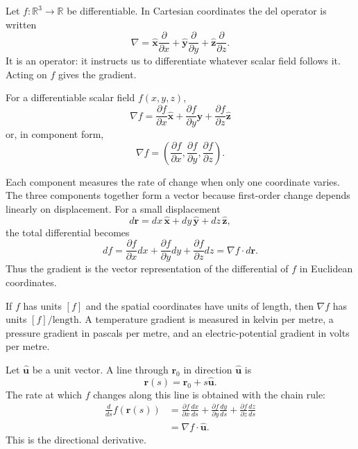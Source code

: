 
Let $f:\mathbb R^3\to\mathbb R$ be differentiable. In Cartesian coordinates the del operator is written
\[
\nabla
=
\hat{\mathbf x}\frac{\partial}{\partial x}
+
\hat{\mathbf y}\frac{\partial}{\partial y}
+
\hat{\mathbf z}\frac{\partial}{\partial z}.
\]
It is an operator: it instructs us to differentiate whatever scalar field follows it. Acting on $f$ gives the gradient.

\begin{bookdefinition}[Gradient]
For a differentiable scalar field $f(x,y,z)$,
\[
\boxed{
\nabla f
=
\frac{\partial f}{\partial x}\hat{\mathbf x}
+
\frac{\partial f}{\partial y}\hat{\mathbf y}
+
\frac{\partial f}{\partial z}\hat{\mathbf z}
}
\]
or, in component form,
\[
\boxed{
\nabla f
=
\left(
\frac{\partial f}{\partial x},
\frac{\partial f}{\partial y},
\frac{\partial f}{\partial z}
\right).
}
\]
\end{bookdefinition}

Each component measures the rate of change when only one coordinate varies. The three components together form a vector because first-order change depends linearly on displacement. For a small displacement
\[
d\mathbf r=dx\,\hat{\mathbf x}+dy\,\hat{\mathbf y}+dz\,\hat{\mathbf z},
\]
the total differential becomes
\[
df
=
\frac{\partial f}{\partial x}dx
+
\frac{\partial f}{\partial y}dy
+
\frac{\partial f}{\partial z}dz
=
\boxed{\nabla f\cdot d\mathbf r}.
\]
Thus the gradient is the vector representation of the differential of $f$ in Euclidean coordinates.

\begin{bookinsight}[Units]
If $f$ has units $[f]$ and the spatial coordinates have units of length, then $\nabla f$ has units $[f]/\text{length}$. A temperature gradient is measured in kelvin per metre, a pressure gradient in pascals per metre, and an electric-potential gradient in volts per metre.
\end{bookinsight}


Let $\hat{\mathbf u}$ be a unit vector. A line through $\mathbf r_0$ in direction $\hat{\mathbf u}$ is
\[
\mathbf r(s)=\mathbf r_0+s\hat{\mathbf u}.
\]
The rate at which $f$ changes along this line is obtained with the chain rule:
\begin{align*}
\frac{d}{ds}f(\mathbf r(s))
&=
\frac{\partial f}{\partial x}\frac{dx}{ds}
+
\frac{\partial f}{\partial y}\frac{dy}{ds}
+
\frac{\partial f}{\partial z}\frac{dz}{ds}\\
&=
\nabla f\cdot\hat{\mathbf u}.
\end{align*}
This is the directional derivative.

